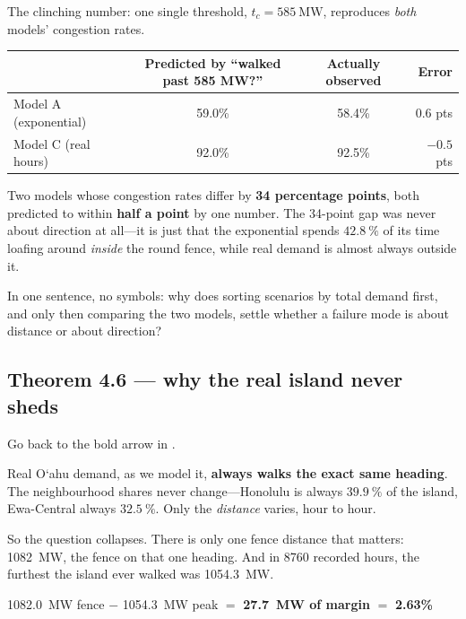 \documentclass[11pt,a4paper]{article}
\newcommand{\okina}{\textquoteleft}
\begin{document}
The clinching number: one single threshold, $t_c = \SI{585}{\mega\watt}$,
reproduces \emph{both} models' congestion rates.

\begin{center}
\small
\begin{tabular}{@{}lcc r@{}}
\toprule
& Predicted by ``walked past 585 MW?'' & Actually observed & Error \\
\midrule
Model A (exponential) & 59.0\% & 58.4\% & $0.6$ pts \\
Model C (real hours)  & 92.0\% & 92.5\% & $-0.5$ pts \\
\bottomrule
\end{tabular}
\end{center}

Two models whose congestion rates differ by \textbf{34 percentage points}, both
predicted to within \textbf{half a point} by one number. The 34-point gap was
never about direction at all---it is just that the exponential spends
$\SI{42.8}{\percent}$ of its time loafing around \emph{inside} the round fence,
while real demand is almost always outside it.

\begin{teach}
In one sentence, no symbols: why does sorting scenarios by total demand first,
and only then comparing the two models, settle whether a failure mode is about
distance or about direction?
\end{teach}

\subsection{Theorem 4.6 --- why the real island never sheds}

\begin{anchor}
Go back to the bold arrow in .

Real O\okina ahu demand, as we model it, \textbf{always walks the exact same
heading}. The neighbourhood shares never change---Honolulu is always
$\SI{39.9}{\percent}$ of the island, Ewa-Central always $\SI{32.5}{\percent}$.
Only the \emph{distance} varies, hour to hour.

So the question collapses. There is only one fence distance that matters:
\SI{1082}{\mega\watt}, the fence on that one heading. And in \num{8760} recorded
hours, the furthest the island ever walked was \SI{1054.3}{\mega\watt}.
\end{anchor}

\begin{center}
\begin{tcolorbox}[colback=warnclr!6,colframe=warnclr,boxrule=0pt,leftrule=3pt,
                  arc=1pt,width=0.88\textwidth]
\centering
\SI{1082.0}{\mega\watt} fence $-$ \SI{1054.3}{\mega\watt} peak
$=$ \textbf{\SI{27.7}{\mega\watt} of margin} $=$ \textbf{2.63\%}
\end{tcolorbox}
\end{center}
\end{document}
